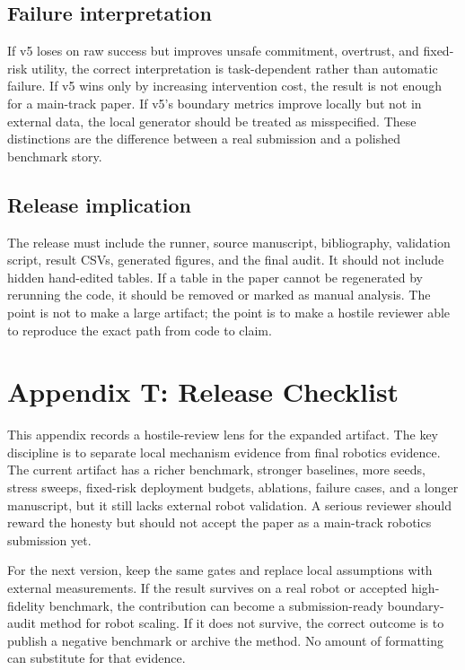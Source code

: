 \documentclass{article}
\begin{document}
\subsection{Failure interpretation}
If v5 loses on raw success but improves unsafe commitment, overtrust, and fixed-risk utility, the correct interpretation is task-dependent rather than automatic failure. If v5 wins only by increasing intervention cost, the result is not enough for a main-track paper. If v5's boundary metrics improve locally but not in external data, the local generator should be treated as misspecified. These distinctions are the difference between a real submission and a polished benchmark story.

\subsection{Release implication}
The release must include the runner, source manuscript, bibliography, validation script, result CSVs, generated figures, and the final audit. It should not include hidden hand-edited tables. If a table in the paper cannot be regenerated by rerunning the code, it should be removed or marked as manual analysis. The point is not to make a large artifact; the point is to make a hostile reviewer able to reproduce the exact path from code to claim.


\section{Appendix T: Release Checklist}
This appendix records a hostile-review lens for the expanded artifact. The key discipline is to separate local mechanism evidence from final robotics evidence. The current artifact has a richer benchmark, stronger baselines, more seeds, stress sweeps, fixed-risk deployment budgets, ablations, failure cases, and a longer manuscript, but it still lacks external robot validation. A serious reviewer should reward the honesty but should not accept the paper as a main-track robotics submission yet.

For the next version, keep the same gates and replace local assumptions with external measurements. If the result survives on a real robot or accepted high-fidelity benchmark, the contribution can become a submission-ready boundary-audit method for robot scaling. If it does not survive, the correct outcome is to publish a negative benchmark or archive the method. No amount of formatting can substitute for that evidence.
\end{document}
